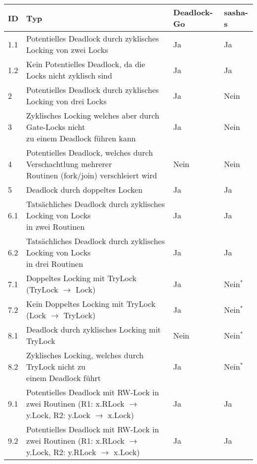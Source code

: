 \begin{table}[H]
\centering
\begin{tabular}{|l|l|l|l|}
    \hline
    \textbf{ID} & \textbf{Typ} & \textbf{Deadlock-Go} & \textbf{sasha-s} \\ \hline
    1.1 & Potentielles Deadlock durch zyklisches Locking von zwei Locks & Ja & Ja \\ \hline
    1.2 & Kein Potentielles Deadlock, da die Locks nicht zyklisch sind & Ja & Ja \\ \hline
    2 & Potentielles Deadlock durch zyklisches Locking von drei Locks & Ja & Nein \\ \hline
    3 & \makecell[l]{Zyklisches Locking welches aber durch Gate-Locks nicht\\zu einem Deadlock führen kann} & Ja & Nein \\ \hline
    4 & \makecell[l]{Potentielles Deadlock, welches durch Verschachtlung mehrerer\\Routinen (fork/join) verschleiert wird} & Nein & Nein \\ \hline
    5 & Deadlock durch doppeltes Locken & Ja & Ja \\ \hline
    6.1 & \makecell[l]{Tatsächliches Deadlock durch zyklisches Locking von Locks\\in zwei Routinen} & Ja & Ja \\ \hline
    6.2 & \makecell[l]{Tatsächliches Deadlock durch zyklisches Locking von Locks\\in drei Routinen} & Ja & Ja \\ \hline
    7.1 & Doppeltes Locking mit TryLock (TryLock $\to$ Lock) & Ja & Nein$^*$ \\ \hline
    7.2 & Kein Doppeltes Locking mit TryLock (Lock $\to$ TryLock) & Ja & Nein$^*$\\ \hline
    8.1 & Deadlock durch zyklisches Locking mit TryLock & Nein &Nein$^*$ \\ \hline
    8.2 & \makecell[l]{Zyklisches Locking, welches durch TryLock nicht zu\\einem Deadlock führt} & Ja &Nein$^*$ \\ \hline   
    9.1 & \makecell[l]{Potentielles Deadlock mit RW-Lock in zwei Routinen\\(R1: x.RLock $\to$ y.Lock, R2: y.Lock $\to$ x.Lock)} & Ja & Ja \\ \hline
    9.2 & \makecell[l]{Potentielles Deadlock mit RW-Lock in zwei Routinen\\(R1: x.RLock $\to$ y.Lock, R2: y.RLock $\to$ x.Lock)} & Ja & Ja \\ \hline

\end{tabular}
\end{table}

